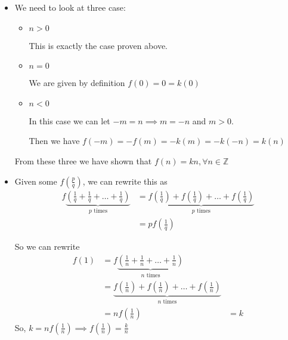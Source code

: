\documentclass[12pt,letterpaper]{article}
\begin{document}
\begin{enumerate}[label=Exercise 4.3.\arabic*]
\begin{enumerate}
\begin{itemize}
\begin{proof}
                Thus we have shown by induction that $f(n) = kn, \forall n \in \mathbb{N}$
              \end{proof}
            \item
              We need to look at three case:
              \begin{itemize}
                \item
                  $n > 0$

                  This is exactly the case proven above.

                \item
                  $n = 0$

                  We are given by definition $f(0) = 0 = k(0)$

                \item
                  $n < 0$

                  In this case we can let $-m = n \implies m = -n$ and $m >0$.

                  Then we have $f(-m) = -f(m) = -k(m) = -k(-n) = k(n)$
              \end{itemize}

              From these three we have shown that $f(n) = kn, \forall n \in \mathbb{Z}$
            \item
              Given some $f\left(\frac{p}{q}\right)$, we can rewrite this as
              \begin{align*}
                f\underbrace{\left(\frac{1}{q} + \frac{1}{q} + \dots + \frac{1}{q}\right)}_{p\text{ times}}
                &= \underbrace{f\left(\frac{1}{q}\right) + f\left(\frac{1}{q}\right) + \dots + f\left(\frac{1}{q}\right)}_{p\text{ times}} \\
                &= p f\left(\frac{1}{q}\right)
              \end{align*}

              So we can rewrite
              \begin{align*}
                f(1)
                &= f\underbrace{\left(\frac{1}{n} + \frac{1}{n} + \dots + \frac{1}{n}\right)}_{n\text{ times}} \\
                &= \underbrace{f\left(\frac{1}{n}\right) + f\left(\frac{1}{n}\right) + \dots + f\left(\frac{1}{n}\right)}_{n\text{ times}} \\
                &= n f\left(\frac{1}{n}\right)
                &= k
              \end{align*}
              So, $k = n f\left(\frac{1}{n}\right) \implies f\left(\frac{1}{n}\right) = \frac{k}{n}$


\end{itemize}
\end{enumerate}
\end{enumerate}
\end{document}
